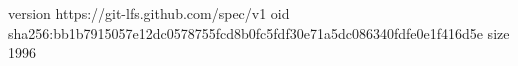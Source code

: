 version https://git-lfs.github.com/spec/v1
oid sha256:bb1b7915057e12dc0578755fcd8b0fc5fdf30e71a5dc086340fdfe0e1f416d5e
size 1996
